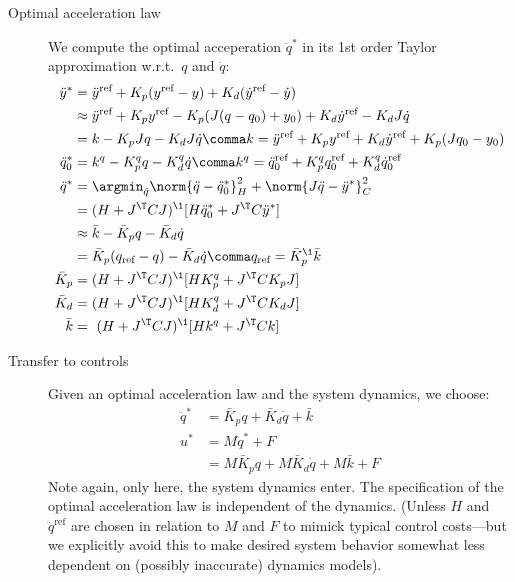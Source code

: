 \documentclass[10pt,fleqn,twoside]{article}
\newcommand{\rf}{{\text{ref}}}
\begin{document}
\begin{description}
\item[Optimal acceleration law] We compute the optimal acceperation
  $\ddot q^*$ in its 1st order Taylor approximation w.r.t.\ $q$ and
  $\dot q$:
\begin{align}
\ddot y^*
 &= \ddot y^\rf + K_p(y^\rf-y) + K_d (\dot y^\rf -\dot y) \\
 &\approx \ddot y^\rf + K_p y^\rf - K_p (J(q-q_0)+y_0) + K_d \dot y^\rf - K_d J \dot q \\
 &= k - K_p J q - K_d J \dot q \comma k = \ddot y^\rf + K_p y^\rf+ K_d \dot y^\rf + K_p (J q_0 - y_0) \\
\ddot q_0^*
 &= k^q - K^q_p q - K^q_d \dot q
\comma k^q = \ddot q_0^\rf + K^q_p q_0^\rf+ K^q_d \dot q_0^\rf \\
\ddot q^*
 &= \argmin_{\ddot q} \norm{\ddot q - \ddot q_0^*}^2_H + \norm{J \ddot q - \ddot y^*}^2_C \\
 &= (H + J^\T C J)^\1 [H \ddot q_0^* + J^\T C \ddot y^*] \\
 &\approx
 \bar k - \bar K_p q - \bar K_d \dot q \\
 &= \bar K_p (q_\rf - q) - \bar K_d \dot q \comma q_\rf = \bar K_p^\1 \bar k  \label{eqProjGains}\\
\bar K_p
 &= (H + J^\T C J)^\1 [H K^q_p + J^\T C K_p J] \\
\bar K_d
 &= (H + J^\T C J)^\1 [H K^q_d + J^\T C K_d J] \\
\bar k
 &= ~ (H + J^\T C J)^\1 [H k^q + J^\T C k]
\end{align}


\item[Transfer to controls] Given an optimal acceleration law and the
  system dynamics, we choose:
\begin{align}
\ddot q^*
 &= \bar K_p q + \bar K_d \dot q + \bar k \\
u^*
 &= M \ddot q^* + F \\
 &= M \bar K_p q + M \bar K_d \dot q + M \bar k + F
\end{align}
Note again, only here, the system dynamics enter. The specification of
the optimal acceleration law is independent of the dynamics. (Unless
$H$ and $\ddot q^\rf$ are chosen in relation to $M$ and $F$ to mimick
typical control costs---but we explicitly avoid this to make desired
system behavior somewhat less dependent on (possibly inaccurate)
dynamics models).



\end{description}
\end{document}
